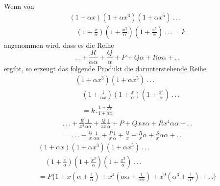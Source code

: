 \noindent Wenn von
\[
\begin{gathered}(1+\alpha x)(1+\alpha x^{3})(1+\alpha x^{5})\ .\,.\,.
\\[7pt]\quad{}(1+\tfrac{x}{\alpha})(1+\tfrac{x^{3}}{\alpha})(1+\tfrac{x^{5}}{\alpha})\ .\,.\,.=k\end{gathered}
\]
\noindent angenommen wird, dass es die Reihe
\[
.\,.+\frac{R}{\alpha\alpha}+\frac{Q}{\alpha}+P+Q\alpha+R\alpha\alpha+ .\,.
\]
\noindent ergibt, so erzeugt das folgende Produkt die darunterstehende Reihe
\[
\begin{gathered}(1+\alpha x^{3})(1+\alpha x^{5})\ .\,.\,.
\\[7pt]\quad{}(1+\tfrac1{\alpha x})(1+\tfrac{x}{\alpha})(1+\tfrac{x^{3}}{\alpha})\ .\,.\,.
\\[7pt]\quad{}=k\,.\frac{1+\frac1{\alpha x}}{1+\alpha x}\end{gathered}
\]
\[
\begin{gathered}
.\,.\,.+\frac{R}{x^{4}}\frac1{\alpha\alpha}
+\frac{Q}{xx}\frac1\alpha+P+Qxx\alpha+Rx^{4}\alpha\alpha+ .\,.
\\[7pt]
=.\,.\,.+\frac{Q}{x}\frac1{\alpha\alpha}+\frac{P}{x}\frac1\alpha
+\frac{Q}{x}+\frac{R}{x}\alpha+\frac{S}{x}\alpha\alpha+ .\,.
\end{gathered}
\]
\[
\begin{gathered}
(1+\alpha x)(1+\alpha x^{3})(1+\alpha x^{5})\ .\,.\,.
\\[7pt]\quad{}(1+\tfrac{x}{\alpha})(1+\tfrac{x^{3}}{\alpha})(1+\tfrac{x^{5}}{\alpha})\ .\,.\,.
\\[7pt]
=P\{1+x(\alpha+\tfrac1\alpha)
+x^{4}(\alpha\alpha+\tfrac1{\alpha\alpha})
+x^{9}(\alpha^{3}+\tfrac1{\alpha^{3}})+ .\,.\}
\end{gathered}
\]

